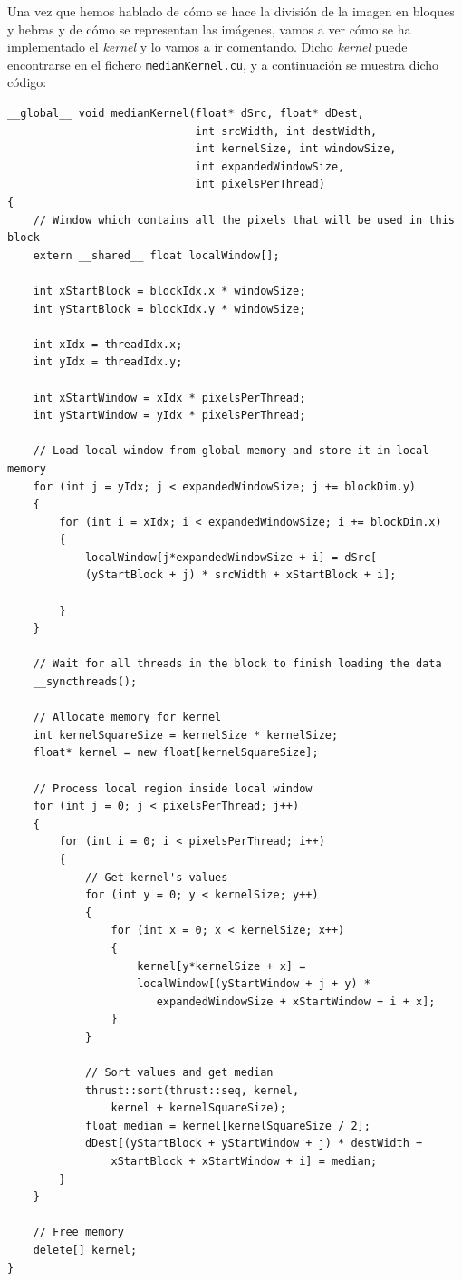 \documentclass[11pt,a4paper]{article}
\begin{document}
Una vez que hemos hablado de cómo se hace la división de la imagen en bloques y hebras y de
cómo se representan las imágenes, vamos a ver cómo se ha implementado el \textit{kernel} y lo
vamos a ir comentando. Dicho \textit{kernel} puede encontrarse en el fichero
\texttt{medianKernel.cu}, y a continuación se muestra dicho código:

\begin{lstlisting}
__global__ void medianKernel(float* dSrc, float* dDest,
							 int srcWidth, int destWidth,
							 int kernelSize, int windowSize,
							 int expandedWindowSize,
							 int pixelsPerThread)
{
    // Window which contains all the pixels that will be used in this block
    extern __shared__ float localWindow[];

    int xStartBlock = blockIdx.x * windowSize;
    int yStartBlock = blockIdx.y * windowSize;

    int xIdx = threadIdx.x;
    int yIdx = threadIdx.y;

    int xStartWindow = xIdx * pixelsPerThread;
    int yStartWindow = yIdx * pixelsPerThread;

    // Load local window from global memory and store it in local memory
    for (int j = yIdx; j < expandedWindowSize; j += blockDim.y)
    {
        for (int i = xIdx; i < expandedWindowSize; i += blockDim.x)
        {
            localWindow[j*expandedWindowSize + i] = dSrc[
            (yStartBlock + j) * srcWidth + xStartBlock + i];

        }
    }

    // Wait for all threads in the block to finish loading the data
    __syncthreads();

    // Allocate memory for kernel
    int kernelSquareSize = kernelSize * kernelSize;
    float* kernel = new float[kernelSquareSize];

    // Process local region inside local window
    for (int j = 0; j < pixelsPerThread; j++)
    {
        for (int i = 0; i < pixelsPerThread; i++)
        {
            // Get kernel's values
            for (int y = 0; y < kernelSize; y++)
            {
                for (int x = 0; x < kernelSize; x++)
                {
                    kernel[y*kernelSize + x] =
                    localWindow[(yStartWindow + j + y) * 
                       expandedWindowSize + xStartWindow + i + x];
                }
            }

            // Sort values and get median
            thrust::sort(thrust::seq, kernel,
            	kernel + kernelSquareSize);
            float median = kernel[kernelSquareSize / 2];
            dDest[(yStartBlock + yStartWindow + j) * destWidth +
            	xStartBlock + xStartWindow + i] = median;
        }
    }

    // Free memory
    delete[] kernel;
}
\end{lstlisting}
\end{document}

